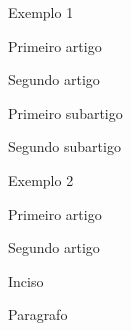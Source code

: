 \begin{resolution}

\item Exemplo 1

    \begin{article}

    \item Primeiro artigo

    \item Segundo artigo

        \begin{subarticle}
         
        \item Primeiro subartigo

        \item Segundo subartigo

        \end{subarticle}

    \end{article}

\item Exemplo 2

    \begin{article}

    \item Primeiro artigo

    \item Segundo artigo

        \begin{ressection}
         
        \item Inciso

        \end{ressection}

        \begin{resparagraph}

        \item Paragrafo

        \end{resparagraph}

    \end{article}

\end{resolution}
